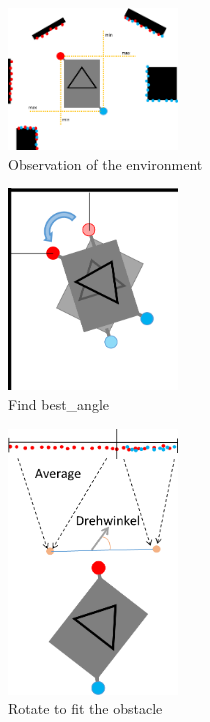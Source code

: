 \begin{figure}[ht]
\centering
\includegraphics[width=0.4\textwidth]{graphics/sensoren.png}
\caption{Observation of the environment}
\label{sensor}
\centering
\end{figure}

\begin{figure}[ht]
\centering
\includegraphics[width=0.4\textwidth]{graphics/find_best_angle.png}
\caption{Find best\_angle}
\label{best}
\centering
\end{figure}

\begin{figure}[ht]
\centering
\includegraphics[width=0.4\textwidth]{graphics/front_parallel.png}
\caption{Rotate to fit the obstacle}
\label{parallel}
\centering
\end{figure}

